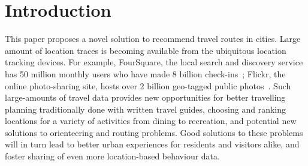
\section{Introduction}
\label{sec:intro}

This paper proposes a novel solution to recommend travel routes in cities. 
Large amount of location traces is becoming available from the ubiquitous location tracking devices. 
For example, FourSquare, the local search and discovery service has 50 million monthly users who have made 8 billion check-ins~\cite{4sq}; Flickr, the online photo-sharing site, hosts over 2 billion geo-tagged public photos~\cite{flickr}. Such large-amounts of travel data provides new opportunities for better 
travelling planning traditionally done with written travel guides, 
choosing and ranking locations for a variety of activities from dining to recreation, 
and potential new solutions to orienteering and routing problems. 
Good solutions to these problems will in turn lead to better urban experiences for residents and visitors alike, and foster sharing of even more location-based behaviour data. 

